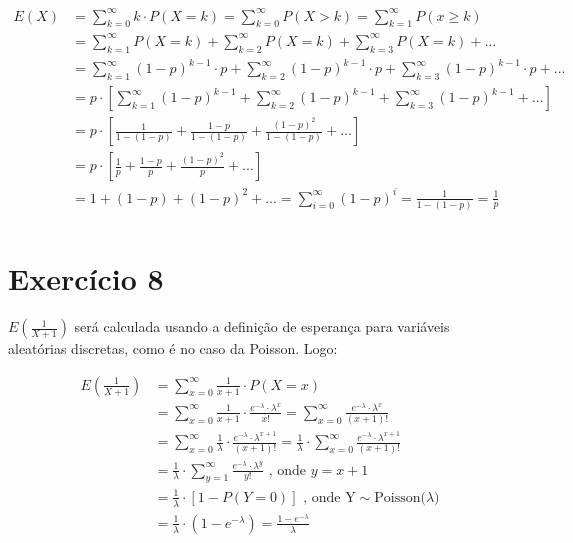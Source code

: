 \documentclass[12pt,letterpaper]{article}
\begin{document}
	\begin{equation*}
		\begin{split}
			E(X) & = \sum_{k=0}^{\infty} k \cdot P(X=k) = \sum_{k=0}^{\infty} P(X>k) = \sum_{k=1}^{\infty} P(x \geq k)\\ 
			& = \sum_{k=1}^{\infty} P(X=k) + \sum_{k=2}^{\infty} P(X=k) + \sum_{k=3}^{\infty} P(X=k) +... \\
			& = \sum_{k=1}^{\infty} (1-p)^{k-1} \cdot p + \sum_{k=2}^{\infty} (1-p)^{k-1} \cdot p + \sum_{k=3}^{\infty} (1-p)^{k-1} \cdot p + ... \\
			& = p \cdot [\sum_{k=1}^{\infty} (1-p)^{k-1} + \sum_{k=2}^{\infty} (1-p)^{k-1} + \sum_{k=3}^{\infty} (1-p)^{k-1} + ...]\\
			& = p \cdot [\frac{1}{1-(1-p)} + \frac{1-p}{1-(1-p)} + \frac{(1-p)^2}{1-(1-p)} + ...]\\
			& = p \cdot [\frac{1}{p} + \frac{1-p}{p} + \frac{(1-p)^2}{p} + ...]\\
			& = 1 + (1-p) + (1-p)^2 + ... = \sum_{i = 0}^{\infty} (1-p)^i = \frac{1}{1-(1-p)} = \frac{1}{p}\\
		\end{split}
	\end{equation*}
	
	\section*{Exercício 8}
	
	$E(\frac{1}{X+1})$ será calculada usando a definição de esperança para variáveis aleatórias discretas, como é no caso da Poisson. Logo:
	
	\begin{equation*}
		\begin{split}
			E(\frac{1}{X+1}) & = \sum_{x=0}^{\infty} \frac{1}{x+1} \cdot P(X=x)\\
			& = \sum_{x=0}^{\infty} \frac{1}{x+1} \cdot \frac{e^{-\lambda}\cdot \lambda^x}{x!} = \sum_{x=0}^{\infty} \frac{e^{-\lambda}\cdot \lambda^x}{(x+1)!} \\
			& = \sum_{x=0}^{\infty}\frac{1}{\lambda} \cdot \frac{e^{-\lambda}\cdot \lambda^{x+1}}{(x+1)!} = \frac{1}{\lambda} \cdot \sum_{x=0}^{\infty} \frac{e^{-\lambda}\cdot \lambda^{x+1}}{(x+1)!} \\
			& = \frac{1}{\lambda} \cdot \sum_{y=1}^{\infty} \frac{e^{-\lambda}\cdot \lambda^y}{y!} \text{ , onde $y=x+1$}\\
			& = \frac{1}{\lambda} \cdot [1-P(Y=0)] \text{ , onde Y$\sim$Poisson($\lambda$)} \\ 
			& = \frac{1}{\lambda} \cdot (1 - e^{-\lambda}) = \frac{1 - e^{-\lambda}}{\lambda} 
	\end{split}
	\end{equation*}
	
	
\end{document}
